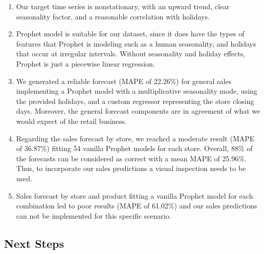 \begin{enumerate}
\item Our target time series is nonstationary, with an upward trend, clear seasonality factor, and a reasonable correlation with holidays. 
\item Prophet model is suitable for our dataset, since it does have the types of features that Prophet is modeling such as a human seasonality, and holidays that occur at irregular intervals. Without seasonality and holiday effects, Prophet is just a piecewise linear regression.
\item We generated a reliable forecast (MAPE of 22.26\%) for general sales implementing a Prophet model with a multiplicative seasonality mode, using the provided holidays, and a custom regressor representing the store closing days. Moreover, the general forecast components are in agreement of what we would expect of the retail business. 
\item Regarding the sales forecast by store, we reached a moderate result (MAPE of 36.87\%) fitting 54 vanilla Prophet models for each store. Overall, 88\% of the forecasts can be considered as correct with a mean MAPE of 25.96\%. Thus, to incorporate our sales predictions a visual inspection needs to be used.
\item Sales forecast by store and product fitting a vanilla Prophet model for each combination led to poor results (MAPE of 61.02\%) and our sales predictions can not be implemented for this specific scenario. 
\end{enumerate}

\subsection[Next Steps]{Next Steps}
\label{sec:next-steps}


